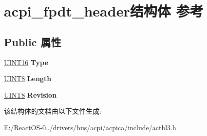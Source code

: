 \hypertarget{structacpi__fpdt__header}{}\section{acpi\+\_\+fpdt\+\_\+header结构体 参考}
\label{structacpi__fpdt__header}
\subsection*{Public 属性}
\begin{DoxyCompactItemize}
\item 
\mbox{\label{structacpi__fpdt__header_a2a0009709939c69363acfbb324b531a1}} 
\hyperlink{_processor_bind_8h_a09f1a1fb2293e33483cc8d44aefb1eb1}{U\+I\+N\+T16} {\bfseries Type}
\item 
\mbox{\label{structacpi__fpdt__header_aacb9a4d30b1b607fb10bc861daef75fa}} 
\hyperlink{_processor_bind_8h_ab27e9918b538ce9d8ca692479b375b6a}{U\+I\+N\+T8} {\bfseries Length}
\item 
\mbox{\label{structacpi__fpdt__header_ad84950588a3fc29ad2e7ff8495bb5860}} 
\hyperlink{_processor_bind_8h_ab27e9918b538ce9d8ca692479b375b6a}{U\+I\+N\+T8} {\bfseries Revision}
\end{DoxyCompactItemize}


该结构体的文档由以下文件生成\+:\begin{DoxyCompactItemize}
\item 
E\+:/\+React\+O\+S-\/0../drivers/bus/acpi/acpica/include/actbl3.\+h\end{DoxyCompactItemize}
